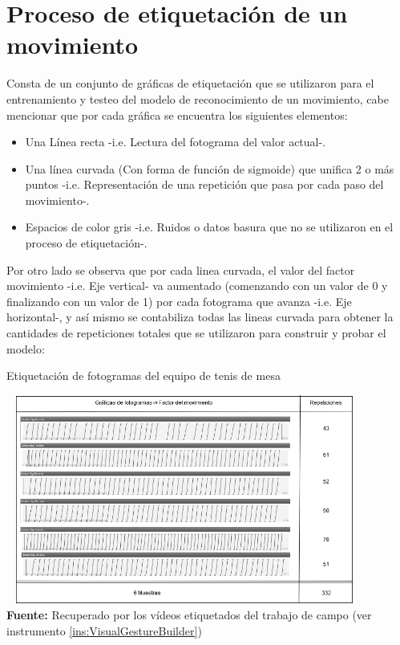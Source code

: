 \section{Proceso de etiquetaci\'on de un movimiento}
Consta de un conjunto de gr\'aficas de etiquetaci\'on que se utilizaron para el entrenamiento y testeo del modelo de reconocimiento de un  movimiento, cabe mencionar que por cada gr\'afica se encuentra los siguientes elementos:
\begin{itemize}
\item Una L\'inea recta -i.e. Lectura del fotograma del valor actual-.
\item Una l\'inea curvada (Con forma de funci\'on de sigmoide) que unifica 2 o m\'as puntos -i.e. Representaci\'on de una repetici\'on que pasa por cada paso del movimiento-.
\item Espacios de color gris -i.e. Ruidos o datos basura que no se utilizaron en el proceso de etiquetaci\'on-.
\end{itemize}
Por otro lado se observa que por cada linea curvada, el valor del factor movimiento -i.e. Eje vertical- va aumentado (comenzando con un valor de 0 y finalizando con un valor de 1) por cada fotograma que avanza -i.e. Eje horizontal-, y as\'i mismo se contabiliza todas las lineas curvada para obtener la cantidades de repeticiones totales que se utilizaron para construir y probar el modelo: 
\begin{chart}[H]
	\caption{Etiquetaci\'on de fotogramas del equipo de tenis de mesa}
	\label{fig:etiquetaTenis}
	\centering
	\includegraphics[width=445px,height=260px]{graphics/resultados/GraSegTenisDeMesa.PNG} \\
	\textbf{Fuente:} Recuperado por los v\'ideos etiquetados del trabajo de campo (ver instrumento \ref{ins:VisualGestureBuilder})
\end{chart}

